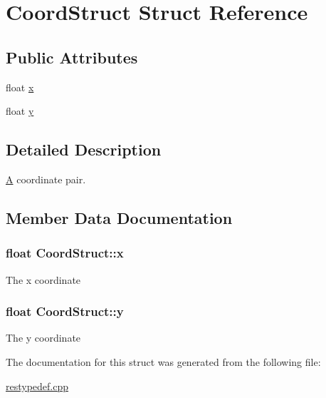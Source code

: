 \hypertarget{struct_coord_struct}{\section{Coord\-Struct Struct Reference}
\label{struct_coord_struct}
}
\subsection*{Public Attributes}
\begin{DoxyCompactItemize}
\item 
float \hyperlink{struct_coord_struct_a183d7226fc5a8470ce9b9f04f9cb69bb}{x}
\item 
float \hyperlink{struct_coord_struct_a1a5966a881bc3e76e9becf00639585ac}{y}
\end{DoxyCompactItemize}


\subsection{Detailed Description}
\hyperlink{class_a}{A} coordinate pair. 

\subsection{Member Data Documentation}
\hypertarget{struct_coord_struct_a183d7226fc5a8470ce9b9f04f9cb69bb}{
\subsubsection[{x}]{\setlength{\rightskip}{0pt plus 5cm}float Coord\-Struct\-::x}}\label{struct_coord_struct_a183d7226fc5a8470ce9b9f04f9cb69bb}
The x coordinate \hypertarget{struct_coord_struct_a1a5966a881bc3e76e9becf00639585ac}{
\subsubsection[{y}]{\setlength{\rightskip}{0pt plus 5cm}float Coord\-Struct\-::y}}\label{struct_coord_struct_a1a5966a881bc3e76e9becf00639585ac}
The y coordinate 

The documentation for this struct was generated from the following file\-:\begin{DoxyCompactItemize}
\item 
\hyperlink{restypedef_8cpp}{restypedef.\-cpp}\end{DoxyCompactItemize}
